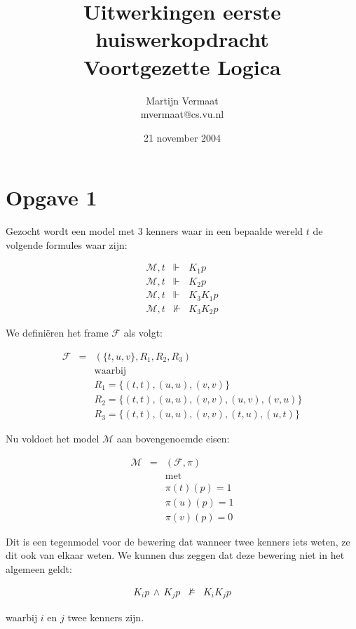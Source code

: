 \documentclass[a4paper,11pt]{article}
\title{Uitwerkingen eerste huiswerkopdracht\\Voortgezette Logica}
\author{
    Martijn Vermaat\\
    mvermaat@cs.vu.nl
}
\date{21 november 2004}
\begin{document}
\maketitle


\section*{Opgave 1}

Gezocht wordt een model met 3 kenners waar in een bepaalde wereld
$t$ de volgende formules waar zijn:

\begin{eqnarray*}
\mathcal{M},t & \Vdash & K_{1} p        \\
\mathcal{M},t & \Vdash & K_{2} p        \\
\mathcal{M},t & \Vdash & K_{3} K_{1} p  \\
\mathcal{M},t & \nVdash & K_{3} K_{2} p
\end{eqnarray*}

We defini\"eren het frame $\mathcal{F}$ als volgt:

\begin{eqnarray*}
\mathcal{F} & = & (\{t,u,v\}, R_{1}, R_{2}, R_{3}) \\
& & \mbox{waarbij}                                 \\
& & R_{1} = \{(t,t), (u,u), (v,v)\}                \\
& & R_{2} = \{(t,t), (u,u), (v,v), (u,v), (v,u)\}  \\
& & R_{3} = \{(t,t), (u,u), (v,v), (t,u), (u,t)\}
\end{eqnarray*}

Nu voldoet het model $\mathcal{M}$ aan bovengenoemde eisen:

\begin{eqnarray*}
\mathcal{M} & = & (\mathcal{F}, \pi) \\
& & \mbox{met}                       \\
& & \pi(t)(p) = 1                    \\
& & \pi(u)(p) = 1                    \\
& & \pi(v)(p) = 0
\end{eqnarray*}

Dit is een tegenmodel voor de bewering dat wanneer twee kenners iets
weten, ze dit ook van elkaar weten. We kunnen dus zeggen dat deze
bewering niet in het algemeen geldt:

\begin{eqnarray*}
K_{i} p \, \wedge \, K_{j} p & \nvDash & K_{i} K_{j} p
\end{eqnarray*}

waarbij $i$ en $j$ twee kenners zijn.
\end{document}

